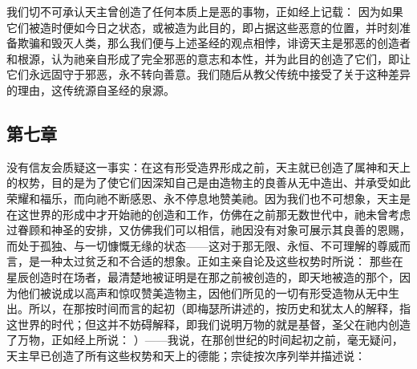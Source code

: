 \par

我们切不可承认天主曾创造了任何本质上是恶的事物，正如经上记载：  因为如果它们被造时便如今日之状态，或被造为此目的，即占据这些恶意的位置，并时刻准备欺骗和毁灭人类，那么我们便与上述圣经的观点相悖，诽谤天主是邪恶的创造者和根源，认为祂亲自形成了完全邪恶的意志和本性，并为此目的创造了它们，即让它们永远固守于邪恶，永不转向善意。我们随后从教父传统中接受了关于这种差异的理由，这传统源自圣经的泉源。\par


\subsection{第七章}

\par

没有信友会质疑这一事实：在这有形受造界形成之前，天主就已创造了属神和天上的权势，目的是为了使它们因深知自己是由造物主的良善从无中造出、并承受如此荣耀和福乐，而向祂不断感恩、永不停息地赞美祂。因为我们也不可想象，天主是在这世界的形成中才开始祂的创造和工作，仿佛在之前那无数世代中，祂未曾考虑过眷顾和神圣的安排，又仿佛我们可以相信，祂因没有对象可展示其良善的恩赐，而处于孤独、与一切慷慨无缘的状态——这对于那无限、永恒、不可理解的尊威而言，是一种太过贫乏和不合适的想象。正如主亲自论及这些权势时所说： 那些在星辰创造时在场者，最清楚地被证明是在那之前被创造的，即天地被造的那个，因为他们被说成以高声和惊叹赞美造物主，因他们所见的一切有形受造物从无中生出。所以，在那按时间而言的起初（即梅瑟所讲述的，按历史和犹太人的解释，指这世界的时代；但这并不妨碍解释，即我们说明万物的就是基督，圣父在祂内创造了万物，正如经上所说： ）——我说，在那创世纪的时间起初之前，毫无疑问，天主早已创造了所有这些权势和天上的德能；宗徒按次序列举并描述说： \par


